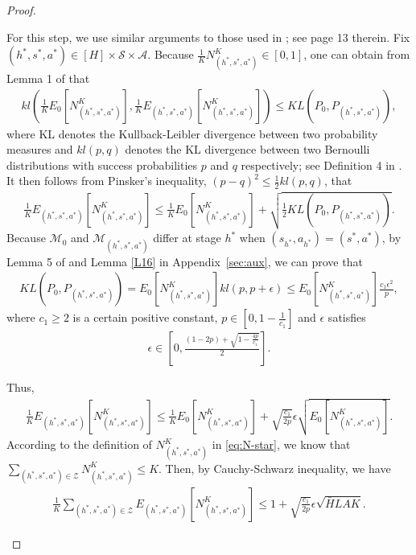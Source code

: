 \documentclass[11pt]{article}
\newcommand{\1}{\mathbbm{1}}
\begin{document}
\begin{proof}
\begin{itemize}
For this step, we use similar arguments to those used in \cite{domingues2021episodic}; see page 13 therein.
Fix $(h^*,s^*,a^*)\in [H]\times \mathcal{S}\times \mathcal{A}$. Because $\frac{1}{K}N_{(h^*,s^*,a^*)}^K\in [0,1]$, one can obtain from Lemma 1 of \cite{garivier2019explore} that 
\begin{align*}
kl\left (\frac{1}{K}E_0\left[N_{(h^*,s^*,a^*)}^K\right],\frac{1}{K}E_{(h^*,s^*,a^*)}\left[N_{(h^*,s^*,a^*)}^K\right]\right )\leq KL(P_0,P_{(h^*,s^*,a^*)}),
\end{align*}
where KL denotes the Kullback-Leibler divergence between two probability measures and $kl(p,q)$ denotes the KL divergence between two Bernoulli distributions with success probabilities $p$ and $q$ respectively; see Definition 4 in \cite{domingues2021episodic}. It then follows from Pinsker's inequality, $(p-q)^2\leq \frac{1}{2}kl(p,q)$, that 
\begin{align*}
\frac{1}{K}E_{(h^*,s^*,a^*)}\left[N_{(h^*,s^*,a^*)}^K\right]\leq \frac{1}{K}E_0\left[N_{(h^*,s^*,a^*)}^K\right]+\sqrt{\frac{1}{2}KL(P_{0},P_{(h^*,s^*,a^*)})}.
\end{align*}
Because $\mathcal{M}_0$ and $\mathcal{M}_{(h^*,s^*,a^*)}$ differ at stage $h^*$ when $(s_{h^*},a_{h^*})=(s^*,a^*)$, by Lemma 5 of \cite{domingues2021episodic} and Lemma \ref{L16} in Appendix~\ref{sec:aux}, we can prove that 
\begin{align*}
KL\left(P_{0},P_{(h^*,s^*,a^*)}\right)=E_0\left[N_{(h^*,s^*,a^*)}^K\right]kl(p,p+\epsilon)\leq E_0\left[N_{(h^*,s^*,a^*)}^K\right]\frac{c_1\epsilon^2}{p},
\end{align*}
where $c_1\geq 2$ is a certain positive constant, $p\in [0,1-\frac{1}{c_1}]$ and $\epsilon$ satisfies
\begin{align}\label{eq:eps-constraint}
\epsilon\in \left [0,\frac{(1-2p)+\sqrt{1-\frac{4p}{c_1}}}{2}\right ].
\end{align}

Thus, 
\begin{align*}
\frac{1}{K}E_{(h^*,s^*,a^*)}\left[N_{(h^*,s^*,a^*)}^K\right]\leq \frac{1}{K}E_0\left[N_{(h^*,s^*,a^*)}^K\right]+\sqrt{\frac{c_1}{2p}}\epsilon\sqrt{E_0\left[N_{(h^*,s^*,a^*)}^K\right]}.
\end{align*}
According to the definition of $N_{(h^*,s^*,a^*)}^K$ in \eqref{eq:N-star}, we know that $\mathop{\sum}_{(h^*,s^*,a^*) \in \mathcal{Z} }N_{(h^*,s^*,a^*)}^K\leq K$. Then, by Cauchy-Schwarz inequality, we have
\begin{align}\label{S21}
\frac{1}{K}\mathop{\sum}_{(h^*,s^*,a^*) \in \mathcal{Z} }E_{(h^*,s^*,a^*)}\left[N_{(h^*,s^*,a^*)}^K\right]\leq 1+\sqrt{\frac{c_1}{2p}}\epsilon\sqrt{\bar{H}LAK}.
\end{align}




\end{itemize}
\end{proof}
\end{document}
